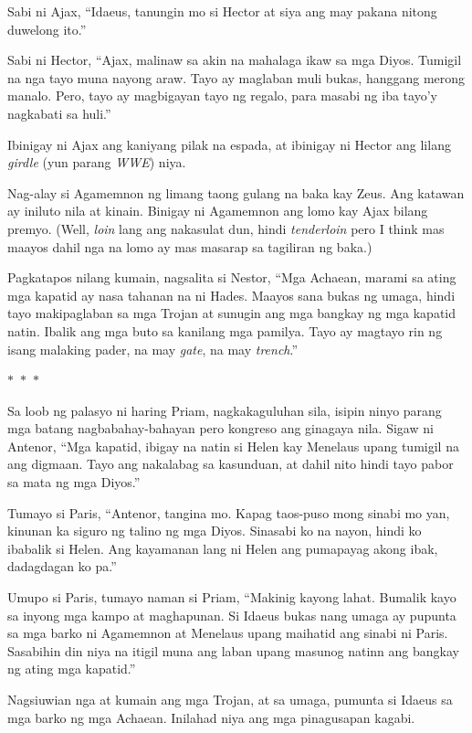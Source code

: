 \documentclass[12pt,letterpaper]{report}
\newcommand{\seperate}{\begin{center}$\ast$~$\ast$~$\ast$\end{center}}
\begin{document}
Sabi ni Ajax, ``Idaeus, tanungin mo si Hector at siya ang may pakana nitong duwelong ito.''

Sabi ni Hector, ``Ajax, malinaw sa akin na mahalaga ikaw sa mga Diyos. Tumigil na nga tayo muna nayong araw. Tayo ay maglaban muli bukas, hanggang merong manalo. Pero, tayo ay magbigayan tayo ng regalo, para masabi ng iba tayo'y nagkabati sa huli.''

Ibinigay ni Ajax ang kaniyang pilak na espada, at ibinigay ni Hector ang lilang \textit{girdle} (yun parang \textit{WWE}) niya.

Nag-alay si Agamemnon ng limang taong gulang na baka kay Zeus. Ang katawan ay iniluto nila at kinain. Binigay ni Agamemnon ang lomo kay Ajax bilang premyo. (Well, \textit{loin} lang ang nakasulat dun, hindi \textit{tenderloin} pero I think mas maayos dahil nga na lomo ay mas masarap sa tagiliran ng baka.)

Pagkatapos nilang kumain, nagsalita si Nestor, ``Mga Achaean, marami sa ating mga kapatid ay nasa tahanan na ni Hades. Maayos sana bukas ng umaga, hindi tayo makipaglaban sa mga Trojan at sunugin ang mga bangkay ng mga kapatid natin. Ibalik ang mga buto sa kanilang mga pamilya. Tayo ay magtayo rin ng isang malaking pader, na may \textit{gate}, na may \textit{trench}.''

\seperate

Sa loob ng palasyo ni haring Priam, nagkakaguluhan sila, isipin ninyo parang mga batang nagbabahay-bahayan pero kongreso ang ginagaya nila. Sigaw ni Antenor, ``Mga kapatid, ibigay na natin si Helen kay Menelaus upang tumigil na ang digmaan. Tayo ang nakalabag sa kasunduan, at dahil nito hindi tayo pabor sa mata ng mga Diyos.''

Tumayo si Paris, ``Antenor, tangina mo. Kapag taos-puso mong sinabi mo yan, kinunan ka siguro ng talino ng mga Diyos. Sinasabi ko na nayon, hindi ko ibabalik si Helen. Ang kayamanan lang ni Helen ang pumapayag akong ibak, dadagdagan ko pa.''

Umupo si Paris, tumayo naman si Priam, ``Makinig kayong lahat. Bumalik kayo sa inyong mga kampo at maghapunan. Si Idaeus bukas nang umaga ay pupunta sa mga barko ni Agamemnon at Menelaus upang maihatid ang sinabi ni Paris. Sasabihin din niya na itigil muna ang laban upang masunog natinn ang bangkay ng ating mga kapatid.''

Nagsiuwian nga at kumain ang mga Trojan, at sa umaga, pumunta si Idaeus sa mga barko ng mga Achaean. Inilahad niya ang mga pinagusapan kagabi.
\end{document}

